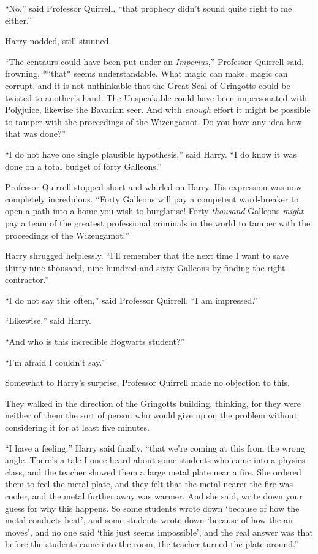 ``No,'' said Professor Quirrell, ``that prophecy didn't sound quite
right to me either.''

Harry nodded, still stunned.

``The centaurs could have been put under an \emph{Imperius},'' Professor
Quirrell said, frowning, *``that* seems understandable. What magic can
make, magic can corrupt, and it is not unthinkable that the Great Seal
of Gringotts could be twisted to another's hand. The Unspeakable could
have been impersonated with Polyjuice, likewise the Bavarian seer. And
with \emph{enough} effort it might be possible to tamper with the
proceedings of the Wizengamot. Do you have any idea how that was done?''

``I do not have one single plausible hypothesis,'' said Harry. ``I do
know it was done on a total budget of forty Galleons.''

Professor Quirrell stopped short and whirled on Harry. His expression
was now completely incredulous. ``Forty Galleons will pay a competent
ward-breaker to open a path into a home you wish to burglarise! Forty
\emph{thousand} Galleons \emph{might} pay a team of the greatest
professional criminals in the world to tamper with the proceedings of
the Wizengamot!''

Harry shrugged helplessly. ``I'll remember that the next time I want to
save thirty-nine thousand, nine hundred and sixty Galleons by finding
the right contractor.''

``I do not say this often,'' said Professor Quirrell. ``I am
impressed.''

``Likewise,'' said Harry.

``And who is this incredible Hogwarts student?''

``I'm afraid I couldn't say.''

Somewhat to Harry's surprise, Professor Quirrell made no objection to
this.

They walked in the direction of the Gringotts building, thinking, for
they were neither of them the sort of person who would give up on the
problem without considering it for at least five minutes.

``I have a feeling,'' Harry said finally, ``that we're coming at this
from the wrong angle. There's a tale I once heard about some students
who came into a physics class, and the teacher showed them a large metal
plate near a fire. She ordered them to feel the metal plate, and they
felt that the metal nearer the fire was cooler, and the metal further
away was warmer. And she said, write down your guess for why this
happens. So some students wrote down `because of how the metal conducts
heat', and some students wrote down `because of how the air moves', and
no one said `this just seems impossible', and the real answer was that
before the students came into the room, the teacher turned the plate
around.''

